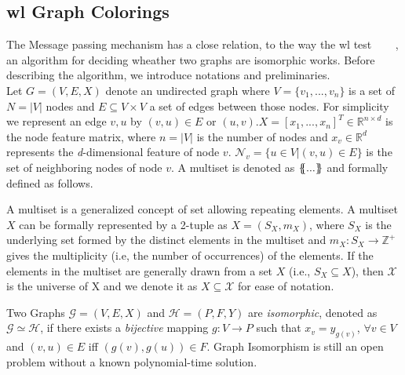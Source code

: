 \subsection{\acl{wl} Graph Colorings}
\label{sec:related:character:wl}
The Message passing mechanism has a close relation, to the way the \acf{wl} test ~\cite{Weisfeiler1968}
~\cite{Damke2020}~\cite{Huang2022}, an algorithm for deciding wheather two graphs are isomorphic works.
Before describing the algorithm, we introduce notations and preliminaries.\\
Let $G = (V,E, X)$ denote an undirected graph where $V =\{v_{1},...,v_{n}\}$ is a set of $ N = |V|$
nodes and $E \subseteq V\times V $ a set of edges between those nodes. For simplicity we
represent an edge ${v,u}$ by $(v,u) \in E$ or $(u,v)$.$X= [x_{1},...,x_{n}]^{T} \in \mathbb{R}^{n \times d}$
is the node feature matrix, where $n = |V|$ is the number of nodes and $x_{v} \in \mathbb{R}^{d}$
represents the \textit{d}-dimensional feature of node $v$. $\mathcal{N}_{v}= \{u \in V|(v,u) \in E\}$
is the set of neighboring nodes of node $v$. A multiset is denoted
as $\ldblbrace...\rdblbrace$ and formally defined as follows.
\begin{defn}[Multiset]
    A multiset is a generalized concept of set allowing repeating elements. A multiset $X$
    can be formally represented by a 2-tuple as $X = (S_{X}, m_{X})$, where $S_{X}$ is the
    underlying set formed by the distinct elements in the multiset and $m_{X}:S_{X} \rightarrow
        \mathbb{Z}^{+}$ gives the multiplicity (i.e, the number of occurrences) of the elements.
    If the elements in the multiset are generally drawn from a set $X$ (i.e., $S_{X} \subseteq X$),
    then $\mathcal{X}$ is the universe of X and we denote it as $X \subseteq \mathcal{X}$ for ease
    of notation.
\end{defn}
\begin{defn}[Isomorphism]
    Two Graphs $\mathcal{G}= (V,E,X)$ and $\mathcal{H}= (P,F,Y)$ are \textit{isomorphic}, denoted as
    $\mathcal{G} \simeq \mathcal{H}$, if there exists a \textit{bijective} mapping $g: V \rightarrow P$
    such that $x_{v}= y_{g(v)}$, $\forall v \in V$ and $(v,u) \in E$ iff $(g(v),g(u)) \in F$. Graph
    Isomorphism is still an open problem without a known polynomial-time solution.
\end{defn}



